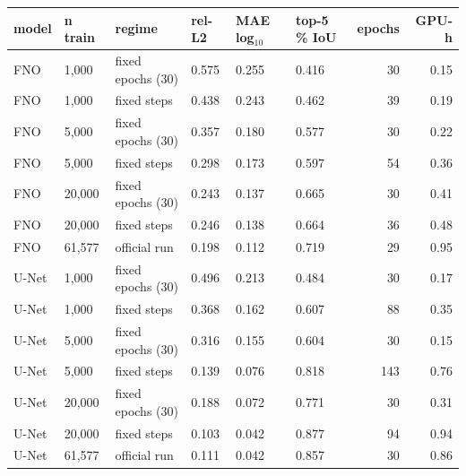 \centering
\footnotesize
\setlength{\tabcolsep}{3.5pt}
\caption{Data-scaling ablation at S on T1 (seed 1): training on 1,000 / 5,000 / 20,000 landscapes for 30 epochs or for the official run's number of optimisation steps, against the official run on all training landscapes.}
\label{tab:wp4}
\begin{tabular}{llllllrr}
\toprule
model & n train & regime & rel-L2 & MAE log$_{10}$ & top-5 \% IoU & epochs & GPU-h \\
\midrule
FNO & 1,000 & fixed epochs (30) & 0.575 & 0.255 & 0.416 & 30 & 0.15 \\
FNO & 1,000 & fixed steps & 0.438 & 0.243 & 0.462 & 39 & 0.19 \\
FNO & 5,000 & fixed epochs (30) & 0.357 & 0.180 & 0.577 & 30 & 0.22 \\
FNO & 5,000 & fixed steps & 0.298 & 0.173 & 0.597 & 54 & 0.36 \\
FNO & 20,000 & fixed epochs (30) & 0.243 & 0.137 & 0.665 & 30 & 0.41 \\
FNO & 20,000 & fixed steps & 0.246 & 0.138 & 0.664 & 36 & 0.48 \\
FNO & 61,577 & official run & 0.198 & 0.112 & 0.719 & 29 & 0.95 \\
U-Net & 1,000 & fixed epochs (30) & 0.496 & 0.213 & 0.484 & 30 & 0.17 \\
U-Net & 1,000 & fixed steps & 0.368 & 0.162 & 0.607 & 88 & 0.35 \\
U-Net & 5,000 & fixed epochs (30) & 0.316 & 0.155 & 0.604 & 30 & 0.15 \\
U-Net & 5,000 & fixed steps & 0.139 & 0.076 & 0.818 & 143 & 0.76 \\
U-Net & 20,000 & fixed epochs (30) & 0.188 & 0.072 & 0.771 & 30 & 0.31 \\
U-Net & 20,000 & fixed steps & 0.103 & 0.042 & 0.877 & 94 & 0.94 \\
U-Net & 61,577 & official run & 0.111 & 0.042 & 0.857 & 30 & 0.86 \\
\bottomrule
\end{tabular}
